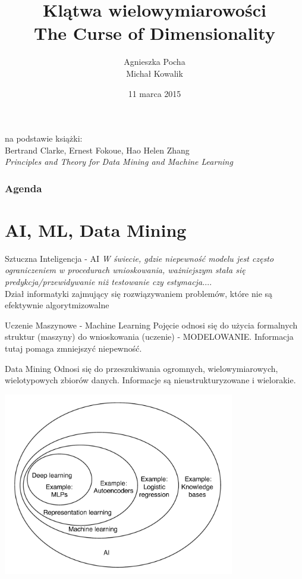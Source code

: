 \documentclass[a4paper]{beamer}
\author{Agnieszka Pocha \\ Michał Kowalik}
\title{Klątwa wielowymiarowości \\ The Curse of Dimensionality}
\date{11 marca 2015}
\begin{document}
\begin{frame}
\titlepage
{\footnotesize
na podstawie książki: \\
Bertrand Clarke, Ernest Fokoue, Hao Helen Zhang \\
}
\textit{Principles and Theory for Data Mining and Machine Learning}
\end{frame}


\begin{frame}
\frametitle{Agenda}
\tableofcontents
\end{frame}

\section{AI, ML, Data Mining}
\begin{frame}
\begin{block}{Sztuczna Inteligencja - AI}
\textit{W świecie, gdzie niepewność modelu jest często ograniczeniem w procedurach wnioskowania, ważniejszym stała się predykcja/przewidywanie niż testowanie czy estymacja.}... \\
Dział informatyki zajmujący się rozwiązywaniem problemów, które nie są efektywnie algorytmizowalne
\end{block}
\pause
\begin{block}{Uczenie Maszynowe - Machine Learning}
Pojęcie odnosi się do użycia formalnych struktur (maszyny) do wnioskowania (uczenie) - MODELOWANIE. Informacja tutaj pomaga zmniejszyć niepewność.
\end{block}
\pause
\begin{block}{Data Mining}
Odnosi się do przeszukiwania ogromnych, wielowymiarowych, wielotypowych zbiorów danych. Informacje są nieustrukturyzowane i wielorakie.
\end{block}
\end{frame}
\begin{frame}

\begin{center}
\includegraphics[height=8cm]{aiclasification.png}
\end{center}
\end{frame}
\end{document}
